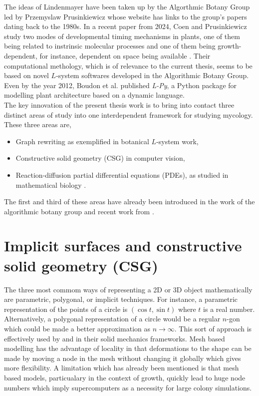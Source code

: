 The ideas  
of Lindenmayer have been taken up by the Algorthmic Botany Group \cite{algorithmicbotany_papers}
led by Przemyslaw Prusinkiewicz whose website has links to the group's papers dating
back to the 1980s. In a recent paper from 2024, Coen and Prusinkiewicz study 
two modes of developmental timing mechanisms in plants, one of them being related 
to instrinsic molecular processes and one of them being growth-dependent, for instance, dependent 
on space being available \cite{coen2024developmental}. Their computational methology,
which is of relevance to the current thesis, seems to be based on novel $L$-system
softwares developed in the Algorithmic Botany Group. Even by the year 2012, 
Boudon et al. \cite{boudon2012py} published \textit{L-Py}, a Python package 
for modelling plant architecture based on a dynamic language.  
\\

The key innovation of the present thesis work is to 
bring into contact three distinct areas of 
study into one interdependent framework for studying mycology. These three 
areas are,
\begin{itemize}
    \item Graph rewriting as exemplified in botanical $L$-system work,
    \item Constructive solid geometry (CSG) in computer vision,
    \item Reaction-diffusion partial differential equations (PDEs),
          as studied in mathematical biology \cite{turing1990chemical}.
\end{itemize}
The first and third of these areas have already been introduced in the work of 
the algorithmic botany group and recent work from \cite{tronnolone2018diffusion}.

\section{Implicit surfaces and constructive solid geometry (CSG)}

The three most commom ways 
of representing a 2D or 3D object mathematically are parametric, polygonal,
or implicit techniques. For instance, a parametric representation of the 
points of a circle is $(\cos{t}, \sin{t})$ where $t$
is a real number. Alternatively, a polygonal representation of a circle
would be a regular $n$-gon which could be made a better approximation 
as $n \rightarrow \infty$. This sort of approach is effectively used 
by \cite{van2020quantitative} and \cite{brown2021rigid} in their solid mechanics
frameworks. Mesh based modelling has the advantage of locality in that 
deformations to the shape can be made by moving a node in the mesh
without changing it globally which gives more flexibility.
A limitation which has already been mentioned is that mesh based models, 
particualary in the context of growth, quickly lead to huge node numbers 
which imply supercomputers as a necessity for large colony simulations.
\\

